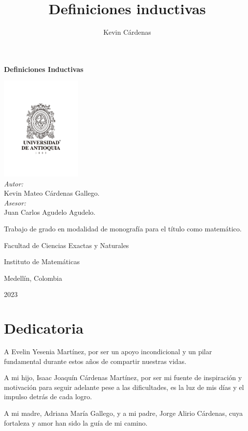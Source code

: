 \documentclass[11pt,oneside]{report}
\title{Definiciones inductivas}
\author{Kevin Cárdenas}
\theoremstyle{plain}
\theoremstyle{definition}
\begin{document}
\begin{titlepage}
    \begin{center}
        {\Huge \textbf{Definiciones Inductivas}}
        \vfill

        \includegraphics[width=0.3\textwidth]{Logosímbolo+Universidad+de+Antioquia+vertical+®-02.png}\\
        \large\emph{Autor:}\\
        Kevin Mateo Cárdenas Gallego.\\
        \large\emph{Asesor:}\\
        Juan Carlos Agudelo Agudelo.\\
        {\large Trabajo de grado en modalidad de monografía para el título como matemático.\par}
        {Facultad de Ciencias Exactas y Naturales \par}
        {Instituto de Matemáticas \par}
        \vspace{1mm}
        {Medellín, Colombia \par}
        \vspace{1mm}
        {\large 2023\par}
    \end{center}
\end{titlepage}

\chapter*{Dedicatoria}
A Evelin Yesenia Martínez, por ser un apoyo incondicional y un pilar fundamental durante estos años de compartir nuestras vidas.

A mi hijo, Isaac Joaquín Cárdenas Martínez, por ser mi fuente de inspiración y motivación para seguir adelante pese a las dificultades, es la luz de mis días y el impulso detrás de cada logro.

A mi madre, Adriana María Gallego, y a mi padre, Jorge Alirio Cárdenas, cuya fortaleza y amor han sido la guía de mi camino.
\end{document}
